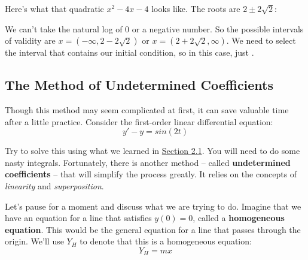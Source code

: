 Here's what that quadratic $x^{2} - 4x - 4$ looks like. The roots are $2 \pm 2\sqrt{2}$:
\begin{center}
\end{center}

We can't take the natural log of 0 or a negative number. So the possible intervals of validity are $x = (-\infty, 2 - 2\sqrt{2})$ or $x = (2 + 2\sqrt{2}, \infty)$. We need to select the interval that contains our initial condition, so in this case, just .

\subsection{The Method of Undetermined Coefficients}
Though this method may seem complicated at first, it can save valuable time after a little practice. Consider the first-order linear differential equation:
\begin{equation} \label{uceq1}
	y' - y = sin(2t)
\end{equation}

Try to solve this using what we learned in \hyperref[linear equations]{Section 2.1}. You will need to do some nasty integrals. Fortunately, there is another method – called \textbf{undetermined coefficients} – that will simplify the process greatly. It relies on the concepts of \textit{linearity} and \textit{superposition}.

Let's pause for a moment and discuss what we are trying to do. Imagine that we have an equation for a line that satisfies $y(0) = 0$, called a \textbf{homogeneous equation}. This would be the general equation for a line that passes through the origin. We'll use $Y_{H}$ to denote that this is a homogeneous equation:
$$Y_{H} = mx$$

